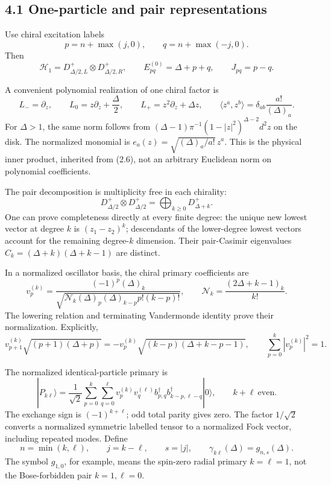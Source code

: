 \documentclass[a4paper,11pt]{article}
\numberwithin{equation}{section}
\begin{document}
\hypertarget{one-particle-and-pair-representations}{%
\subsection{4.1 One-particle and pair representations}\label{one-particle-and-pair-representations}}

Use chiral excitation labels \[
p=n+\max(j,0),\qquad q=n+\max(-j,0).
\] Then \[
\mathcal H_1=D^+_{\Delta/2,L}\otimes D^+_{\Delta/2,R},
\qquad E^{(0)}_{pq}=\Delta+p+q,\qquad J_{pq}=p-q.
\tag{4.1}
\]

A convenient polynomial realization of one chiral factor is \[
L_-=\partial_z,\qquad
L_0=z\partial_z+\frac{\Delta}{2},\qquad
L_+=z^2\partial_z+\Delta z,
\qquad
\langle z^a,z^b\rangle=\delta_{ab}\frac{a!}{(\Delta)_a}.
\tag{4.2}
\] For \(\Delta>1\), the same norm follows from \((\Delta-1)\pi^{-1}(1-|z|^2)^{\Delta-2}d^2z\) on the disk. The normalized monomial is \(e_a(z)=\sqrt{(\Delta)_a/a!}\,z^a\). This is the physical inner product, inherited from (2.6), not an arbitrary Euclidean norm on polynomial coefficients.

The pair decomposition is multiplicity free in each chirality: \[
D^+_{\Delta/2}\otimes D^+_{\Delta/2}
=\bigoplus_{k\ge0}D^+_{\Delta+k}.
\tag{4.3}
\] One can prove completeness directly at every finite degree: the unique new lowest vector at degree \(k\) is \((z_1-z_2)^k\); descendants of the lower-degree lowest vectors account for the remaining degree-\(k\) dimension. Their pair-Casimir eigenvalues \(C_k=(\Delta+k)(\Delta+k-1)\) are distinct.

In a normalized oscillator basis, the chiral primary coefficients are \[
v_p^{(k)}
=\frac{(-1)^p(\Delta)_k}
{\sqrt{\mathcal N_k(\Delta)_p(\Delta)_{k-p}p!(k-p)!}},
\qquad
\mathcal N_k=\frac{(2\Delta+k-1)_k}{k!}.
\tag{4.4}
\] The lowering relation and terminating Vandermonde identity prove their normalization. Explicitly, \[
v_{p+1}^{(k)}\sqrt{(p+1)(\Delta+p)}
=-v_p^{(k)}\sqrt{(k-p)(\Delta+k-p-1)},
\qquad
\sum_{p=0}^k|v_p^{(k)}|^2=1 .
\]

The normalized identical-particle primary is \[
|P_{k\ell}\rangle
=\frac1{\sqrt2}
\sum_{p=0}^k\sum_{q=0}^{\ell}
v_p^{(k)}v_q^{(\ell)}
b^\dagger_{p,q}b^\dagger_{k-p,\ell-q}|0\rangle,
\qquad k+\ell\ \text{even}.
\tag{4.5}
\] The exchange sign is \((-1)^{k+\ell}\); odd total parity gives zero. The factor \(1/\sqrt2\) converts a normalized symmetric labelled tensor to a normalized Fock vector, including repeated modes. Define \[
n=\min(k,\ell),\qquad j=k-\ell,\qquad s=|j|,\qquad
\gamma_{k\ell}(\Delta)=g_{n,s}(\Delta).
\tag{4.6}
\] The symbol \(g_{1,0}\), for example, means the spin-zero radial primary \(k=\ell=1\), not the Bose-forbidden pair \(k=1,\ell=0\).
\end{document}
